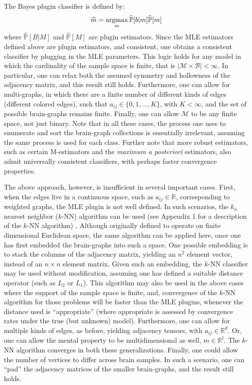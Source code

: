 \documentclass{article}
\newcommand{\PP}{\mathbb{P}}           %
\newcommand{\Real}{\mathbb{R}}           %
\providecommand{\mc}[1]{\mathcal{#1}}
\providecommand{\mh}[1]{\widehat{#1}}
\newcommand{\argmax}{\operatornamewithlimits{argmax}}
\begin{document}
The Bayes plugin classifier is defined by:
\begin{align}
	\mh{m} = \argmax_m  \mh{\PP}[b|m] \mh{\PP}[m] 
\end{align}
where $\mh{\PP}[B|M]$ and $\mh{\PP}[M]$ are plugin estimators.  Since the MLE estimators defined above are plugin estimators, and consistent, one obtains a consistent classifier by plugging in the MLE parameters.  This logic holds for any model in which the cardinality of the sample space is finite, that is $|\mc{M}\times \mc{B}| < \infty$.  In particular, one can relax both the assumed symmetry and hollowness of the adjacency matrix, and this result still holds.  Furthermore, one can allow for multi-graphs, in which there are a finite number of different kinds of edges (different colored edges), such that $a_{ij} \in \{0,1,\ldots, K\}$, with $K < \infty$, and the set of possible brain-graphs remains finite.  Finally, one can allow $\mc{M}$ to be any finite space, not just binary.  Note that in all these cases, the process one uses to enumerate and sort the brain-graph collections is essentially irrelevant, assuming the same process is used for each class.  Further note that more robust estimators, such as certain M-estimators and the \emph{maximum a posteriori} estimators, also admit universally consistent classifiers, with perhaps faster convergence properties.

The above approach, however, is insufficient in several important cases.  First, when the edges live in a continuous space, such as $a_{ij} \in \Real$, corresponding to weighted graphs, the MLE plugin is not well defined.  In such scenarios, the $k_n$ nearest neighbor ($k$-NN) algorithm can be used (see Appendix 1 for a description of the $k$-NN algorithm) \cite{Stone77}.  Although originally defined to operate on finite dimensional Euclidean space, the same algorithm can be applied here, once one has first embedded the brain-graphs into such a space.  One possible embedding is to stack the columns of the adjacency matrix, yielding an $n^2$ element vector, instead of an $n \times n$ element matrix.  Given such an embedding, the $k$-NN classifier may be used without modification, assuming one has defined a suitable distance operator (such as $L_2$ or $L_1$).  This algorithm may also be used in the above cases where the support of the sample space is finite, and, convergence of the $k$-NN algorithm for those problems will be faster than the MLE plugins, whenever the distance used is ``appropriate'' (where appropriate is assessed by convergence rates under the true (but unknown) model).  Furthermore, one can allow for multiple kinds of edges, as before, yielding adjacency tensors, with $a_{ij} \in \Real^d$.  Or, one can allow the mental property to be multidimensional as well, $m \in \Real^l$.  The $k$-NN algorithm converges in both these generalizations.  Finally, one could allow the number of vertices to differ across brain samples.  In such a scenario, one can ``pad'' the adjacency matrices of the smaller brain-graphs, and the result still holds.  
\end{document}
